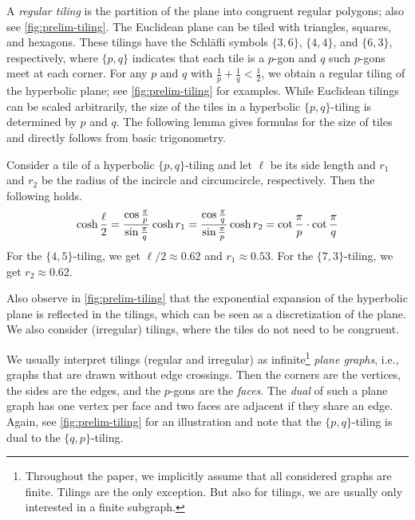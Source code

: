 \documentclass[a4paper,english,cleveref,thm-restate]{lipics-v2021}
\begin{document}
A \emph{regular tiling} is the partition of the plane into congruent regular polygons; also see \cref{fig:prelim-tiling}.
The Euclidean plane can be tiled with triangles, squares, and hexagons.
These tilings have the Schläfli symbols $\{3, 6\}$, $\{4, 4\}$, and $\{6, 3\}$, respectively, where $\{p, q\}$ indicates that each tile is a $p$-gon and $q$ such $p$-gons meet at each corner.
For any $p$ and $q$ with $\frac{1}{p} + \frac{1}{q} < \frac{1}{2}$, we obtain a regular tiling of the hyperbolic plane; see \cref{fig:prelim-tiling} for examples.
While Euclidean tilings can be scaled arbitrarily, the size of the tiles in a hyperbolic $\{p, q\}$-tiling is determined by $p$ and $q$.
The following lemma gives formulas for the size of tiles and directly follows from basic trigonometry.
%
\begin{lemma}
    \label{lem:distances-in-tilings}
    Consider a tile of a hyperbolic $\{p, q\}$-tiling and let $\ell$ be its side length and $r_1$ and $r_2$ be the radius of the incircle and circumcircle, respectively.
    Then the following holds.
    \begin{equation*}
        \cosh \frac{\ell}{2} = \frac{\cos \frac{\pi}{p}}{\sin \frac{\pi}{q}}
        \hfill
        \cosh r_1 = \frac{\cos \frac{\pi}{q}}{\sin \frac{\pi}{p}}
        \hfill
        \cosh r_2 = \cot \frac{\pi}{p} \cdot \cot \frac{\pi}{q}
        \hfill
    \end{equation*}
    For the $\{4, 5\}$-tiling, we get $\ell / 2 \approx 0.62$ and $r_1 \approx 0.53$.
    For the $\{7, 3\}$-tiling, we get $r_2 \approx 0.62$.
\end{lemma}
%
Also observe in \cref{fig:prelim-tiling} that the exponential expansion of the hyperbolic plane is reflected in the tilings, which can be seen as a discretization of the plane.
We also consider (irregular) tilings, where the tiles do not need to be congruent.

We usually interpret tilings (regular and irregular) as infinite\footnote{Throughout the paper, we implicitly assume that all considered graphs are finite.
  Tilings are the only exception.
  But also for tilings, we are usually only interested in a finite subgraph.} \emph{plane graphs}, i.e., graphs that are drawn without edge crossings.
Then the corners are the vertices, the sides are the edges, and the $p$-gons are the \emph{faces}.
The \emph{dual} of such a plane graph has one vertex per face and two faces are adjacent if they share an edge.
Again, see \cref{fig:prelim-tiling} for an illustration and note that the $\{p, q\}$-tiling is dual to the $\{q, p\}$-tiling.
\end{document}
